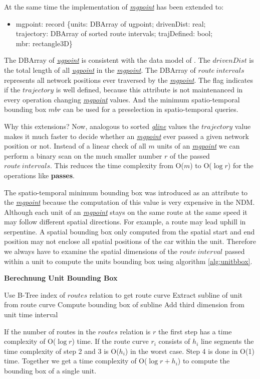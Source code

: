 \documentclass[a4paper]{article}
\newcommand{\op}[1]{\textbf{#1}}
\newcommand{\dt}[1]{\textsl{\underline{#1}}}
\begin{document}
At the same time the implementation of \dt{mgpoint} has been extended to:
\begin{ttfamily}
\begin{itemize}
  \item [] mgpoint: record \{units: DBArray of ugpoint; drivenDist: real;\\
trajectory: DBArray of sorted route intervals; trajDefined: bool;\\
mbr: rectangle3D\}
\end{itemize}
\end{ttfamily}
The DBArray of \dt{ugpoint} is consistent with the data model of \cite{NetworkGueting}.
The $drivenDist$ is the total length of all \dt{ugpoint} in the \dt{mgpoint}.
The DBArray of $route\ intervals$ represents all network positions ever traversed
by the \dt{mgpoint}. The flag indicates if the $trajectory$ is well defined,
because this attribute is not maintenanced in every operation changing \dt{mgpoint}
values. And the minimum spatio-temporal bounding box $mbr$ can be used for a preselection
in spatio-temporal queries.

Why this extensions?
Now, analogous to sorted \dt{gline} values the $trajectory$ value makes it much
faster to decide whether an \dt{mgpoint} ever passed a given network position or
not. Instead of a linear check of all $m$ units of an \dt{mgpoint} we can perform
a binary scan on the much smaller number $r$ of the passed $route\ intervals$.
This reduces the time complexity from O($m$) to O($\log r$) for the operations
like \op{passes}.

The spatio-temporal minimum bounding box was introduced as an attribute to the
\dt{mgpoint} because the computation of this value is very expensive in the
NDM. Although each unit of an \dt{mgpoint} stays on the same route
at the same speed it may follow different spatial directions. For example, a
route may lead uphill in serpentine. A spatial bounding box only computed from
the spatial start and end position may not enclose all spatial positions of the
car within the unit. Therefore we always have to examine the spatial dimensions
of the $route\ interval$ passed within a unit to compute the units bounding box
using algorithm \ref{alg:unitbbox}.
\begin{algorithm}[H]
  \caption{\op{Berechnung Unit Bounding Box}}
  \label{alg:unitbbox}
  \begin{algorithmic}[1]
    \STATE Use B-Tree index of $routes$ relation to get route curve
    \STATE Extract subline of unit from route curve
    \STATE Compute bounding box of subline
    \STATE Add third dimension from unit time interval
  \end{algorithmic}
\end{algorithm}
If the number of routes in the $routes$ relation is $r$ the first step has a
time complexity of O($\log r$) time. If the route curve $r_i$ consists of $h_i$
line segments the time complexity of step 2 and 3 is O($h_i$) in the worst case.
Step 4 is done in O(1) time. Together we get a time complexity of
O($\log {r} + h_i$) to compute the bounding box of a single unit.
\end{document}
